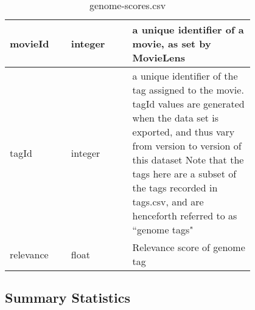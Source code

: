 \documentclass[10pt,titlepage]{article}
\begin{document}
\begin{itemize}
\begin{table}[H]
\begin{tabular}{p{0.2\linewidth} | p{0.2\linewidth} | p{0.4\linewidth}}
                \hline
                movieId & integer & a unique identifier of a movie, as set by MovieLens \\
                \hline
                tagId & integer & a unique identifier of the tag assigned to the movie.  tagId values are generated when the data set is
                exported, and thus vary from version to version of  this dataset  Note that the tags here are a subset of the tags
                recorded in tags.csv, and are henceforth referred to  as ``genome tags" \\
                \hline
                relevance & float & Relevance score of genome tag \\
                \hline

            \end{tabular}
            \caption{genome-scores.csv}
            \label{tab:ml_genome_scores}
        \end{table}


\end{itemize}

\pagebreak
\subsection{Summary Statistics}
\end{document}
